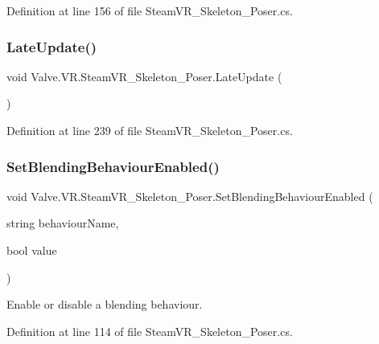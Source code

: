 Definition at line 156 of file Steam\+V\+R\+\_\+\+Skeleton\+\_\+\+Poser.\+cs.

\mbox{\label{class_valve_1_1_v_r_1_1_steam_v_r___skeleton___poser_a86281164f383edd92e20d57a57fafbb5}} 
\subsubsection{\texorpdfstring{LateUpdate()}{LateUpdate()}}
{\footnotesize\ttfamily void Valve.\+V\+R.\+Steam\+V\+R\+\_\+\+Skeleton\+\_\+\+Poser.\+Late\+Update (\begin{DoxyParamCaption}{ }\end{DoxyParamCaption})\hspace{0.3cm}{\ttfamily [protected]}}



Definition at line 239 of file Steam\+V\+R\+\_\+\+Skeleton\+\_\+\+Poser.\+cs.

\mbox{\label{class_valve_1_1_v_r_1_1_steam_v_r___skeleton___poser_a9ffcecfe8838cd4b5d9b2d28e990c8b6}} 
\subsubsection{\texorpdfstring{SetBlendingBehaviourEnabled()}{SetBlendingBehaviourEnabled()}}
{\footnotesize\ttfamily void Valve.\+V\+R.\+Steam\+V\+R\+\_\+\+Skeleton\+\_\+\+Poser.\+Set\+Blending\+Behaviour\+Enabled (\begin{DoxyParamCaption}\item[{string}]{behaviour\+Name,  }\item[{bool}]{value }\end{DoxyParamCaption})}



Enable or disable a blending behaviour. 



Definition at line 114 of file Steam\+V\+R\+\_\+\+Skeleton\+\_\+\+Poser.\+cs.

